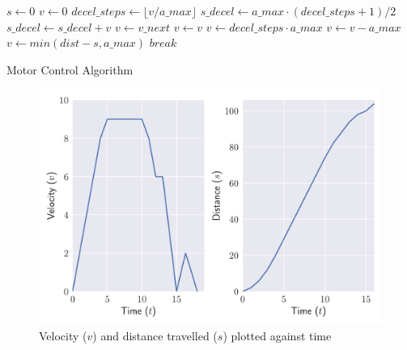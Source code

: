 \begin{algorithm}[h]
  \begin{algorithmic}[1]
\State $s \gets 0$
\State $v \gets 0$
  \State $decel\_steps\gets \lfloor v / a\_max \rfloor$
  \State $s\_decel \gets a\_max \cdot (decel\_steps + 1) / 2$
    \State $s\_decel \gets s\_decel + v$
  \EndIf
    \State $v \gets v\_next$ 
    \State $ v \gets v $     
  \Else
      \State $v \gets decel\_steps \cdot a\_max$
    \Else
      \State $v \gets v - a\_max$
    \EndIf
      
      \State $v \gets min(dist - s, a\_max)$
    \Else
      \State $break$  
  \EndIf
\EndWhile
\end{algorithmic}
\caption{Motor Control Algorithm\label{alg-motor}}
\end{algorithm}
\begin{figure}[h]
  \centerline{\includegraphics[scale=0.65]{fig/motor_control_graph.pdf}}
\caption{Velocity ($v$) and distance travelled ($s$) plotted against time\label{fig-motor}}
\end{figure}

